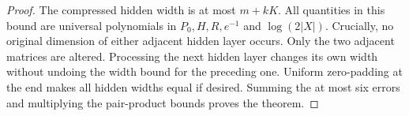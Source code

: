 \begin{proof}
The compressed hidden width is at most $m+kK$. All quantities in this
bound are universal polynomials in $P_0,H,R,e^{-1}$ and
$\log(2|X|)$. Crucially, no original dimension of either adjacent hidden
layer occurs. Only the two adjacent matrices are altered. Processing
the next hidden layer changes its own width without undoing the width
bound for the preceding one. Uniform zero-padding at the end makes
all hidden widths equal if desired. Summing the at most six errors and
multiplying the pair-product bounds proves the theorem.
\end{proof}

